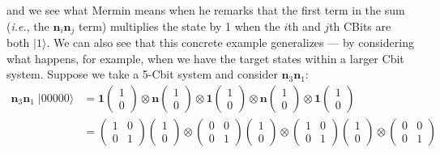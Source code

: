 \documentclass{article}
\begin{document}
and we see what Mermin means when he remarks that the first term in the sum (\textit{i.e.}, the $\bm{n}_i\bm{n}_j$ term) multiplies the state by 1 when the $i$th and $j$th CBits are both $|1\rangle$. We can also see that this concrete example generalizes --- by considering what happens, for example, when we have the target states within a larger Cbit system. Suppose we take a 5-Cbit system and consider $\bm{n}_3\bm{n}_1$:
\begin{align*}
\bm{n}_3\bm{n}_1 \; |00000\rangle
  &= \bm{1}
     \begin{pmatrix}1\\0\end{pmatrix}
     \otimes
     \bm{n}
     \begin{pmatrix}1\\0\end{pmatrix}
     \otimes
     \bm{1}
     \begin{pmatrix}1\\0\end{pmatrix}
     \otimes
     \bm{n}
     \begin{pmatrix}1\\0\end{pmatrix}
     \otimes
     \bm{1}
     \begin{pmatrix}1\\0\end{pmatrix}\\
  &= \begin{pmatrix}1 & 0\\0 & 1\end{pmatrix}
     \begin{pmatrix}1\\0\end{pmatrix}
     \otimes
     \begin{pmatrix}0 & 0\\0 & 1\end{pmatrix}
     \begin{pmatrix}1\\0\end{pmatrix}
     \otimes
     \begin{pmatrix}1 & 0\\0 & 1\end{pmatrix}
     \begin{pmatrix}1\\0\end{pmatrix}
     \otimes
     \begin{pmatrix}0 & 0\\0 & 1\end{pmatrix}

\end{align*}
\end{document}
